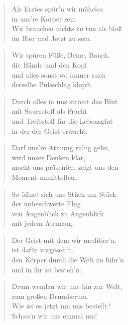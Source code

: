 \documentclass[10pt,a4paper]{article}
\begin{document}
\begin{paracol}{2}
\begin{verse}
Als Erstes spür’n wir mühelos \\
in uns’re Körper rein. \\
Wir brauchen nichts zu tun als bloß \\
im Hier und Jetzt zu sein. \\
\end{verse}

\begin{verse}
Wir spüren Füße, Beine, Bauch, \\
die Hände und den Kopf \\
und alles sonst wo immer auch \\
derselbe Pulsschlag klopft. \\
\end{verse}

\begin{verse}
Durch alles in uns strömt das Blut \\
mit Sauerstoff als Fracht \\
und Treibstoff für die Lebensglut \\
in der der Geist erwacht. \\
\end{verse}

\begin{verse}
Darf uns’re Atmung ruhig gehn, \\
wird unser Denken klar, \\
macht uns präsenter, zeigt uns den \\
Moment unmittelbar. \\
\end{verse}

\begin{verse}
So öffnet sich uns Stück um Stück \\
der unbeschwerte Flug \\
von Augenblick zu Augenblick \\
mit jedem Atemzug. \\
\end{verse}

\begin{verse}
Der Geist mit dem wir meditier’n, \\
ist dafür vorgeseh’n, \\
den Körper durch die Welt zu führ’n \\
und in ihr zu besteh’n. \\
\end{verse}

\begin{verse}
Drum wenden wir uns hin zur Welt, \\
zum großen Drumherum. \\
Wie ist es jetzt um uns bestellt? \\
Schau’n wir uns einmal um! \\
\end{verse}


\end{paracol}
\end{document}
